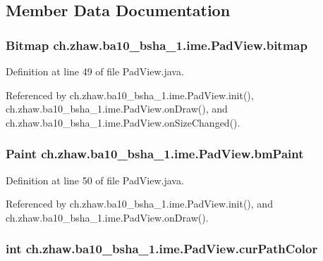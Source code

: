 \subsection{Member Data Documentation}
\hypertarget{classch_1_1zhaw_1_1ba10__bsha__1_1_1ime_1_1PadView_aa24b63a808cf4edc3dc57a42b5d71892}{
\subsubsection[{bitmap}]{\setlength{\rightskip}{0pt plus 5cm}Bitmap {\bf ch.zhaw.ba10\_\-bsha\_\-1.ime.PadView.bitmap}}}
\label{classch_1_1zhaw_1_1ba10__bsha__1_1_1ime_1_1PadView_aa24b63a808cf4edc3dc57a42b5d71892}


Definition at line 49 of file PadView.java.

Referenced by ch.zhaw.ba10\_\-bsha\_\-1.ime.PadView.init(), ch.zhaw.ba10\_\-bsha\_\-1.ime.PadView.onDraw(), and ch.zhaw.ba10\_\-bsha\_\-1.ime.PadView.onSizeChanged().\hypertarget{classch_1_1zhaw_1_1ba10__bsha__1_1_1ime_1_1PadView_a9113cabd4a9c66b85a2224ff87c7756a}{
\subsubsection[{bmPaint}]{\setlength{\rightskip}{0pt plus 5cm}Paint {\bf ch.zhaw.ba10\_\-bsha\_\-1.ime.PadView.bmPaint}}}
\label{classch_1_1zhaw_1_1ba10__bsha__1_1_1ime_1_1PadView_a9113cabd4a9c66b85a2224ff87c7756a}


Definition at line 50 of file PadView.java.

Referenced by ch.zhaw.ba10\_\-bsha\_\-1.ime.PadView.init(), and ch.zhaw.ba10\_\-bsha\_\-1.ime.PadView.onDraw().\hypertarget{classch_1_1zhaw_1_1ba10__bsha__1_1_1ime_1_1PadView_a9fdc4e6d121c7b8d5466b5f0148a6be6}{
\subsubsection[{curPathColor}]{\setlength{\rightskip}{0pt plus 5cm}int {\bf ch.zhaw.ba10\_\-bsha\_\-1.ime.PadView.curPathColor}}}
\label{classch_1_1zhaw_1_1ba10__bsha__1_1_1ime_1_1PadView_a9fdc4e6d121c7b8d5466b5f0148a6be6}


